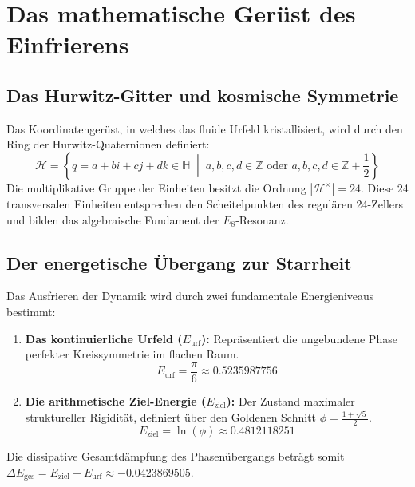 \documentclass[12pt,a4paper]{article}
\begin{document}
	\section{Das mathematische Gerüst des Einfrierens}
	
	\subsection{Das Hurwitz-Gitter und kosmische Symmetrie}
	Das Koordinatengerüst, in welches das fluide Urfeld kristallisiert, wird durch den Ring der Hurwitz-Quaternionen definiert:
	\begin{equation}
		\mathcal{H}=\left\{q=a+bi+cj+dk\in\mathbb{H} \;\middle|\; a, b, c, d\in\mathbb{Z} \text{ oder } a, b, c, d\in\mathbb{Z}+\frac{1}{2}\right\}
	\end{equation}
	Die multiplikative Gruppe der Einheiten besitzt die Ordnung $|\mathcal{H}^{\times}|=24$. Diese 24 transversalen Einheiten entsprechen den Scheitelpunkten des regulären 24-Zellers und bilden das algebraische Fundament der $E_8$-Resonanz.
	
	\subsection{Der energetische Übergang zur Starrheit}
	Das Ausfrieren der Dynamik wird durch zwei fundamentale Energieniveaus bestimmt:
	\begin{enumerate}
		\item \textbf{Das kontinuierliche Urfeld ($E_{\text{urf}}$):} Repräsentiert die ungebundene Phase perfekter Kreissymmetrie im flachen Raum.
		\begin{equation}
			E_{\text{urf}}=\frac{\pi}{6}\approx0.5235987756
		\end{equation}
		\item \textbf{Die arithmetische Ziel-Energie ($E_{\text{ziel}}$):} Der Zustand maximaler struktureller Rigidität, definiert über den Goldenen Schnitt $\phi = \frac{1+\sqrt{5}}{2}$.
		\begin{equation}
			E_{\text{ziel}}=\ln(\phi)\approx0.4812118251
		\end{equation}
	\end{enumerate}
	Die dissipative Gesamtdämpfung des Phasenübergangs beträgt somit $\Delta E_{\text{ges}} = E_{\text{ziel}} - E_{\text{urf}} \approx -0.0423869505$.
	
\end{document}
